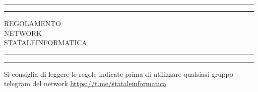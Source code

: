 \documentclass[a4paper, 11pt, oneside, article]{book} %
\begin{document}
 

\begin{titlepage} %

	\centering %
	
	\scshape %
	
	\vspace*{\baselineskip} %
	
	
	\rule{\textwidth}{1.6pt}\vspace*{-\baselineskip}\vspace*{2pt} %
	\rule{\textwidth}{0.4pt} %
	
	\vspace{0.75\baselineskip} %
	
	{\LARGE REGOLAMENTO\\ NETWORK\\ STATALEINFORMATICA\\} %
	
	\vspace{0.75\baselineskip} %
	
	\rule{\textwidth}{0.4pt}\vspace*{-\baselineskip}\vspace{3.2pt} %
	\rule{\textwidth}{1.6pt} %
	
	\vspace{2\baselineskip} %
	
	
	Si consiglia di leggere le regole indicate prima di utilizzare qualsiasi gruppo telegram del network
	\url{https://t.me/stataleinformatica}
	
	\vspace*{3\baselineskip} %
	
	
	
	\vspace{0.5\baselineskip} %
	

\end{titlepage}
\end{document}

